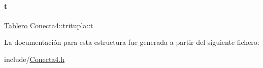 \hypertarget{structConecta4_1_1tritupla_a33cad8a0dc6bf63da02f04c429dd9ec2}{}\label{structConecta4_1_1tritupla_a33cad8a0dc6bf63da02f04c429dd9ec2} 
\paragraph{\texorpdfstring{t}{t}}
{\footnotesize\ttfamily \hyperlink{classTablero}{Tablero} Conecta4\+::tritupla\+::t}



La documentación para esta estructura fue generada a partir del siguiente fichero\+:\begin{DoxyCompactItemize}
\item 
include/\hyperlink{Conecta4_8h}{Conecta4.\+h}\end{DoxyCompactItemize}
